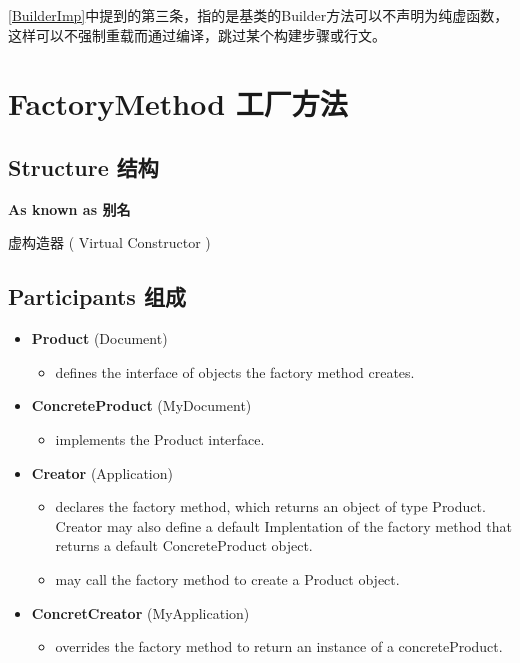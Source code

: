 \ref{BuilderImp}中提到的第三条，指的是基类的Builder方法可以不声明为纯虚函数，这样可以不强制重载而通过编译，跳过某个构建步骤或行文。

\section{FactoryMethod 工厂方法}

\subsection{Structure 结构}


\textbf{ As known as 别名 }

虚构造器 ( Virtual Constructor )

\subsection{Participants 组成}

\begin{itemize}
\small

\item \textbf{Product} (Document)
	\begin{itemize}
		\item defines the interface of objects the factory method creates.
	\end{itemize}

\item \textbf{ConcreteProduct} (MyDocument)
	\begin{itemize}
		\item implements the Product interface.
	\end{itemize}

\item \textbf{Creator} (Application)
	\begin{itemize} 
		\item declares the factory method, which returns an object of type Product. Creator may also define a default Implentation of the factory method that returns a default ConcreteProduct object.

		\item may call the factory method to create a Product object.
	\end{itemize}

\item \textbf{ConcretCreator} (MyApplication)
	\begin{itemize}
		\item overrides the factory method to return an instance of a concreteProduct.
	\end{itemize}

\normalize
\end{itemize}

